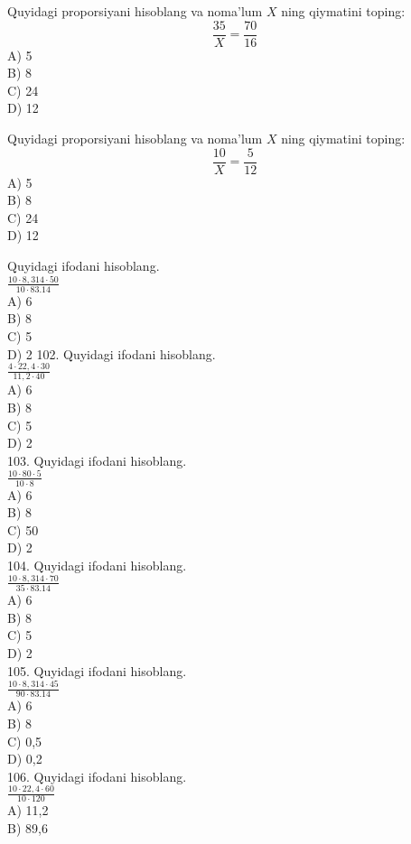 \item Quyidagi proporsiyani hisoblang va noma'lum $X$ ning qiymatini toping:
\[
\frac{35}{X} = \frac{70}{16}
\]
A) 5 \\ 
B) 8 \\ 
C) 24 \\ 
D) 12
\item Quyidagi proporsiyani hisoblang va noma'lum $X$ ning qiymatini toping:
\[
\frac{10}{X} = \frac{5}{12}
\]
A) 5 \\ 
B) 8 \\ 
C) 24 \\ 
D) 12
  \item Quyidagi ifodani hisoblang.\\
$\frac{10 \cdot 8,314 \cdot 50}{10 \cdot 83.14}$\\
A) 6\\
B) 8\\
C) 5\\
D) 2
102. Quyidagi ifodani hisoblang.\\
$\frac{4 \cdot 22,4 \cdot 30}{11,2 \cdot 40}$\\
A) 6\\
B) 8\\
C) 5\\
D) 2\\
103. Quyidagi ifodani hisoblang.\\
$\frac{10 \cdot 80 \cdot 5}{10 \cdot 8}$\\
A) 6\\
B) 8\\
C) 50\\
D) 2\\
104. Quyidagi ifodani hisoblang.\\
$\frac{10 \cdot 8,314 \cdot 70}{35 \cdot 83.14}$\\
A) 6\\
B) 8\\
C) 5\\
D) 2\\
105. Quyidagi ifodani hisoblang.\\
$\frac{10 \cdot 8,314 \cdot 45}{90 \cdot 83.14}$\\
A) 6\\
B) 8\\
C) 0,5\\
D) 0,2\\
106. Quyidagi ifodani hisoblang.\\
$\frac{10 \cdot 22,4 \cdot 60}{10 \cdot 120}$\\
A) 11,2\\
B) 89,6\\
